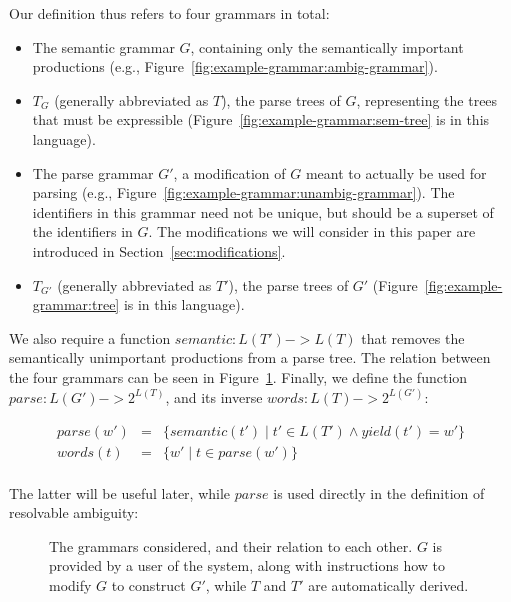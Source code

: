 \documentclass[acmsmall,review,anonymous]{acmart}\settopmatter{printfolios=true,printccs=false,printacmref=false}
\newcommand{\yield}{\mathit{yield}} %
\newcommand{\semantic}{\mathit{semantic}} %
\newcommand{\parse}{\mathit{parse}} %
\newcommand{\words}{\mathit{words}} %
\begin{document}
Our definition thus refers to four grammars in total:

\begin{itemize}
  \item The semantic grammar $G$, containing only the semantically important productions (e.g., Figure~\ref{fig:example-grammar:ambig-grammar}).
  \item $T_G$ (generally abbreviated as $T$), the parse trees of $G$, representing the trees that must be expressible (Figure~\ref{fig:example-grammar:sem-tree} is in this language).
  \item The parse grammar $G'$, a modification of $G$ meant to actually be used for parsing (e.g., Figure~\ref{fig:example-grammar:unambig-grammar}). The identifiers in this grammar need not be unique, but should be a superset of the identifiers in $G$. The modifications we will consider in this paper are introduced in Section~\ref{sec:modifications}.
  \item $T_{G'}$ (generally abbreviated as $T'$), the parse trees of $G'$ (Figure~\ref{fig:example-grammar:tree} is in this language).
\end{itemize}

\noindent We also require a function $\semantic : L(T') -> L(T)$ that removes the semantically unimportant productions from a parse tree. The relation between the four grammars can be seen in Figure~\ref{fig:grammar-square}. Finally, we define the function $\parse : L(G') -> 2^{L(T)}$, and its inverse $\words : L(T) -> 2^{L(G')}$:

$$
\begin{array}{rcl}
\parse(w') & = & \{ \semantic(t') \mid t' \in L(T') \land \yield(t') = w' \} \\
\words(t) & = & \{ w' \mid t \in \parse(w') \} \\
\end{array}
$$

\noindent The latter will be useful later, while $\parse$ is used directly in the definition of resolvable ambiguity:

\begin{figure}
  \caption{The grammars considered, and their relation to each other. $G$ is provided by a user of the system, along with instructions how to modify $G$ to construct $G'$, while $T$ and $T'$ are automatically derived.}
  \label{fig:grammar-square}
\end{figure}
\end{document}
